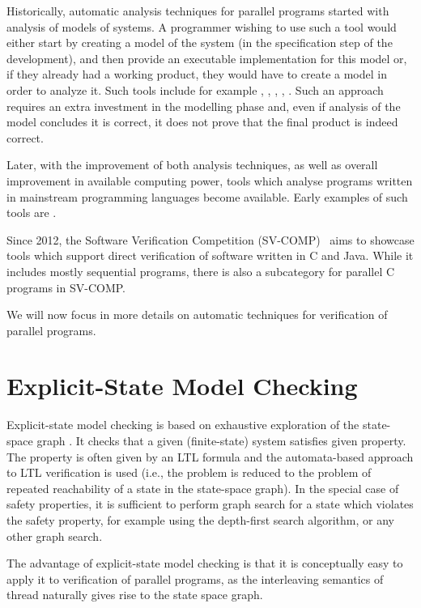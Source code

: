 Historically, automatic analysis techniques for parallel programs started with
analysis of models of systems.
A programmer wishing to use such a tool would either start by creating a model
of the system (in the specification step of the development), and then provide
an executable implementation for this model or, if they already had a working
product, they would have to create a model in order to analyze it.
Such tools include for example \cite{spin}, \cite{divine-mc}, \cite{ltsmin?}, \cite{uppall?}, \cite{TODO...}.
Such an approach requires an extra investment in the modelling phase and, even
if analysis of the model concludes it is correct, it does not prove that the
final product is indeed correct.

Later, with the improvement of both analysis techniques, as well as overall
improvement in available computing power, tools which analyse programs written
in mainstream programming languages become available.
Early examples of such tools are .

Since 2012, the Software Verification Competition (SV-COMP)~\cite{svc2020} aims
to showcase tools which support direct verification of software written in C
and Java.
While it includes mostly sequential programs, there is also a subcategory for
parallel C programs in SV-COMP.

We will now focus in more details on automatic techniques for verification of
parallel programs.

\section{Explicit-State Model Checking}

Explicit-state model checking is based on exhaustive exploration of the
state-space graph \cite{TODO}.
It checks that a given (finite-state) system satisfies given property.
The property is often given by an LTL formula and the automata-based approach
to LTL verification is used (i.e., the problem is reduced to the problem of
repeated reachability of a state in the state-space graph).
In the special case of safety properties, it is sufficient to perform graph
search for a state which violates the safety property, for example using the
depth-first search algorithm, or any other graph search.

The advantage of explicit-state model checking is that it is conceptually easy
to apply it to verification of parallel programs, as the interleaving semantics
of thread naturally gives rise to the state space graph. 

